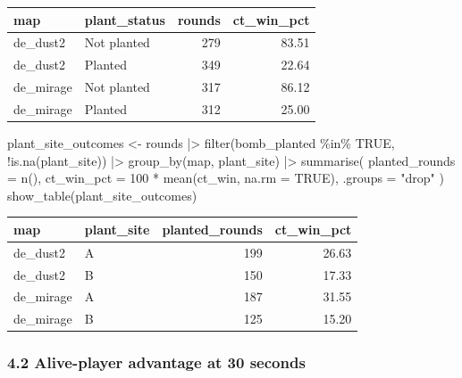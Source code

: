 \documentclass[
  letterpaper,
  DIV=11,
  numbers=noendperiod]{scrartcl}
\newenvironment{Shaded}{\begin{snugshade}}{\end{snugshade}}
\newcommand{\AttributeTok}[1]{\textcolor[rgb]{0.40,0.45,0.13}{#1}}
\newcommand{\ConstantTok}[1]{\textcolor[rgb]{0.56,0.35,0.01}{#1}}
\newcommand{\DecValTok}[1]{\textcolor[rgb]{0.68,0.00,0.00}{#1}}
\newcommand{\FunctionTok}[1]{\textcolor[rgb]{0.28,0.35,0.67}{#1}}
\newcommand{\NormalTok}[1]{\textcolor[rgb]{0.00,0.23,0.31}{#1}}
\newcommand{\OtherTok}[1]{\textcolor[rgb]{0.00,0.23,0.31}{#1}}
\newcommand{\SpecialCharTok}[1]{\textcolor[rgb]{0.37,0.37,0.37}{#1}}
\newcommand{\StringTok}[1]{\textcolor[rgb]{0.13,0.47,0.30}{#1}}
\newcounter{none} %
\begin{document}
{\def\LTcaptype{none} %
\begin{longtable}[]{@{}llrr@{}}
\toprule\noalign{}
map & plant\_status & rounds & ct\_win\_pct \\
\midrule\noalign{}
\endhead
\bottomrule\noalign{}
\endlastfoot
de\_dust2 & Not planted & 279 & 83.51 \\
de\_dust2 & Planted & 349 & 22.64 \\
de\_mirage & Not planted & 317 & 86.12 \\
de\_mirage & Planted & 312 & 25.00 \\
\end{longtable}
}

\begin{Shaded}
\begin{Highlighting}[]
\NormalTok{plant\_site\_outcomes }\OtherTok{\textless{}{-}}\NormalTok{ rounds }\SpecialCharTok{|\textgreater{}}
  \FunctionTok{filter}\NormalTok{(bomb\_planted }\SpecialCharTok{\%in\%} \ConstantTok{TRUE}\NormalTok{, }\SpecialCharTok{!}\FunctionTok{is.na}\NormalTok{(plant\_site)) }\SpecialCharTok{|\textgreater{}}
  \FunctionTok{group\_by}\NormalTok{(map, plant\_site) }\SpecialCharTok{|\textgreater{}}
  \FunctionTok{summarise}\NormalTok{(}
    \AttributeTok{planted\_rounds =} \FunctionTok{n}\NormalTok{(),}
    \AttributeTok{ct\_win\_pct =} \DecValTok{100} \SpecialCharTok{*} \FunctionTok{mean}\NormalTok{(ct\_win, }\AttributeTok{na.rm =} \ConstantTok{TRUE}\NormalTok{),}
    \AttributeTok{.groups =} \StringTok{"drop"}
\NormalTok{  )}
\FunctionTok{show\_table}\NormalTok{(plant\_site\_outcomes)}
\end{Highlighting}
\end{Shaded}

{\def\LTcaptype{none} %
\begin{longtable}[]{@{}llrr@{}}
\toprule\noalign{}
map & plant\_site & planted\_rounds & ct\_win\_pct \\
\midrule\noalign{}
\endhead
\bottomrule\noalign{}
\endlastfoot
de\_dust2 & A & 199 & 26.63 \\
de\_dust2 & B & 150 & 17.33 \\
de\_mirage & A & 187 & 31.55 \\
de\_mirage & B & 125 & 15.20 \\
\end{longtable}
}

\subsubsection{4.2 Alive-player advantage at 30
seconds}\label{alive-player-advantage-at-30-seconds}
\end{document}

